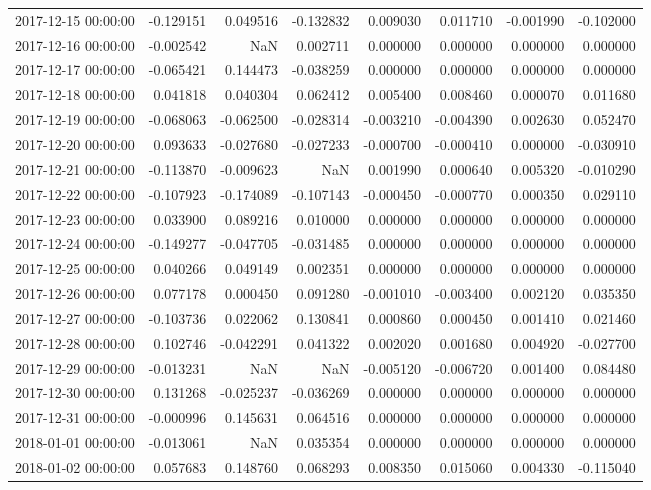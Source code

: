 \begin{tabular}{lrrrrrrr}
2017-12-15 00:00:00 & -0.129151 & 0.049516 & -0.132832 & 0.009030 & 0.011710 & -0.001990 & -0.102000 \\
2017-12-16 00:00:00 & -0.002542 & NaN & 0.002711 & 0.000000 & 0.000000 & 0.000000 & 0.000000 \\
2017-12-17 00:00:00 & -0.065421 & 0.144473 & -0.038259 & 0.000000 & 0.000000 & 0.000000 & 0.000000 \\
2017-12-18 00:00:00 & 0.041818 & 0.040304 & 0.062412 & 0.005400 & 0.008460 & 0.000070 & 0.011680 \\
2017-12-19 00:00:00 & -0.068063 & -0.062500 & -0.028314 & -0.003210 & -0.004390 & 0.002630 & 0.052470 \\
2017-12-20 00:00:00 & 0.093633 & -0.027680 & -0.027233 & -0.000700 & -0.000410 & 0.000000 & -0.030910 \\
2017-12-21 00:00:00 & -0.113870 & -0.009623 & NaN & 0.001990 & 0.000640 & 0.005320 & -0.010290 \\
2017-12-22 00:00:00 & -0.107923 & -0.174089 & -0.107143 & -0.000450 & -0.000770 & 0.000350 & 0.029110 \\
2017-12-23 00:00:00 & 0.033900 & 0.089216 & 0.010000 & 0.000000 & 0.000000 & 0.000000 & 0.000000 \\
2017-12-24 00:00:00 & -0.149277 & -0.047705 & -0.031485 & 0.000000 & 0.000000 & 0.000000 & 0.000000 \\
2017-12-25 00:00:00 & 0.040266 & 0.049149 & 0.002351 & 0.000000 & 0.000000 & 0.000000 & 0.000000 \\
2017-12-26 00:00:00 & 0.077178 & 0.000450 & 0.091280 & -0.001010 & -0.003400 & 0.002120 & 0.035350 \\
2017-12-27 00:00:00 & -0.103736 & 0.022062 & 0.130841 & 0.000860 & 0.000450 & 0.001410 & 0.021460 \\
2017-12-28 00:00:00 & 0.102746 & -0.042291 & 0.041322 & 0.002020 & 0.001680 & 0.004920 & -0.027700 \\
2017-12-29 00:00:00 & -0.013231 & NaN & NaN & -0.005120 & -0.006720 & 0.001400 & 0.084480 \\
2017-12-30 00:00:00 & 0.131268 & -0.025237 & -0.036269 & 0.000000 & 0.000000 & 0.000000 & 0.000000 \\
2017-12-31 00:00:00 & -0.000996 & 0.145631 & 0.064516 & 0.000000 & 0.000000 & 0.000000 & 0.000000 \\
2018-01-01 00:00:00 & -0.013061 & NaN & 0.035354 & 0.000000 & 0.000000 & 0.000000 & 0.000000 \\
2018-01-02 00:00:00 & 0.057683 & 0.148760 & 0.068293 & 0.008350 & 0.015060 & 0.004330 & -0.115040 \\

\end{tabular}

